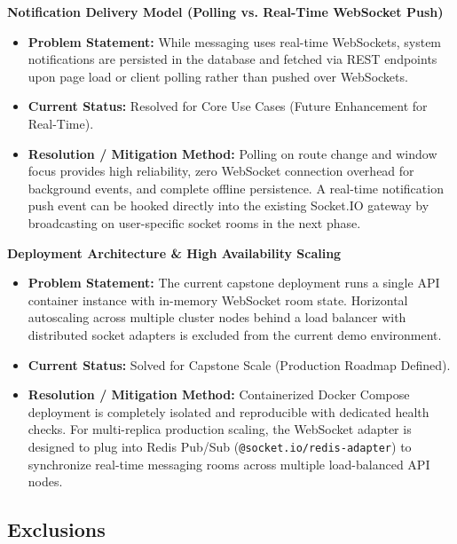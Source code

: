 \begin{description}[leftmargin=2.0cm,labelwidth=1.8cm,align=left,font=\normalfont\bfseries]
\item[LI-12] \textbf{Notification Delivery Model (Polling vs. Real-Time WebSocket Push)}
\begin{itemize}[leftmargin=0.5cm, label=--]
\item \textbf{Problem Statement:} While messaging uses real-time WebSockets, system notifications are persisted in the database and fetched via REST endpoints upon page load or client polling rather than pushed over WebSockets.
\item \textbf{Current Status:} Resolved for Core Use Cases (Future Enhancement for Real-Time).
\item \textbf{Resolution / Mitigation Method:} Polling on route change and window focus provides high reliability, zero WebSocket connection overhead for background events, and complete offline persistence. A real-time notification push event can be hooked directly into the existing Socket.IO gateway by broadcasting on user-specific socket rooms in the next phase.
\end{itemize}

\item[LI-13] \textbf{Deployment Architecture \& High Availability Scaling}
\begin{itemize}[leftmargin=0.5cm, label=--]
\item \textbf{Problem Statement:} The current capstone deployment runs a single API container instance with in-memory WebSocket room state. Horizontal autoscaling across multiple cluster nodes behind a load balancer with distributed socket adapters is excluded from the current demo environment.
\item \textbf{Current Status:} Solved for Capstone Scale (Production Roadmap Defined).
\item \textbf{Resolution / Mitigation Method:} Containerized Docker Compose deployment is completely isolated and reproducible with dedicated health checks. For multi-replica production scaling, the WebSocket adapter is designed to plug into Redis Pub/Sub (\texttt{@socket.io/redis-adapter}) to synchronize real-time messaging rooms across multiple load-balanced API nodes.
\end{itemize}

\end{description}

\subsection{Exclusions}

